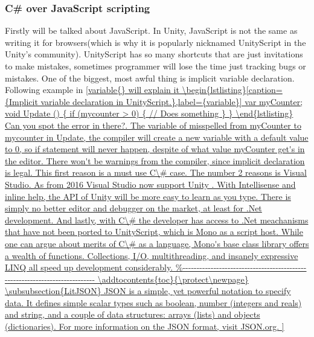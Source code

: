 \subsubsection {C\# over JavaScript scripting}

Firstly will be talked about JavaScript. In Unity, JavaScript is not the same as writing it for browsers(which is why it is popularly nicknamed UnityScript in the Unity's community).
UnityScript has so many shortcuts that are just invitations to make mistakes, sometimes programmer will lose the time just tracking bugs or mistakes. One of the biggest, most awful thing is implicit variable declaration. Following example in  \autoref{variable{} will explain it 

\begin{lstlisting}[caption={Implicit variable declaration in UnityScript.},label={variable}]

var myCounter;

void Update () 
    {
	 if (mycounter > 0)
	    {
	        // Does something
	    }
    }
\end{lstlisting}

Can you spot the error in there?. The variable of misspelled from myCounter to mycounter in Update, the compiler will create a new variable with a default value to 0, so if statement will never happen, despite of what value myCounter get's in the editor.

There won't be warnings from the compiler, since implicit declaration is legal. This first reason is a must use C\# case.

The number 2 reasons is Visual Studio. As from 2016 Visual Studio now support Unity . With Intellisense and inline help, the API of Unity will be more easy to learn as you type. There is simply no better editor and debugger on the market, at least for .Net development.


And lastly, with C\# the developer has access to .Net meachanisms that have not been ported to UnityScript, which is Mono as a script host. While one can argue about merits of C\# as a language, Mono's base class library offers a wealth of functions. Collections, I/O, multithreading, and insanely expressive LINQ all speed up development considerably.

\addtocontents{toc}{\protect\newpage}


\subsubsection{LitJSON}
JSON is a simple, yet powerful notation to specify data. It defines simple scalar types such as boolean, number (integers and reals) and string, and a couple of data structures: arrays (lists) and objects (dictionaries). For more information on the JSON format, visit JSON.org.

}
